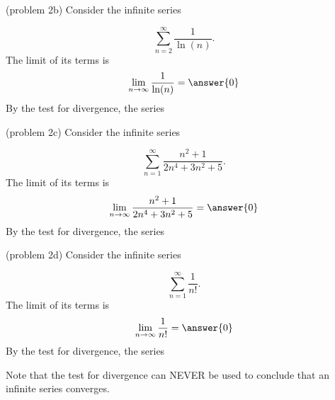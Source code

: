 \documentclass{ximera}
\begin{document}
\begin{problem}(problem 2b)
Consider the infinite series

\[
\sum_{n=2}^\infty  \frac{1}{\ln(n)}.
\]
The limit of its terms is
\[
\lim_{n\to \infty} \frac{1}{\ln(n)} = \answer{0}
\]
By the test for divergence, the series
\begin{multipleChoice}
\end{multipleChoice}

\end{problem}




\begin{problem}(problem 2c)
Consider the infinite series

\[
\sum_{n=1}^\infty \frac{n^2 + 1}{2n^4 + 3n^2 + 5}.
\]
The limit of its terms is
\[
\lim_{n\to \infty} \frac{n^2 + 1}{2n^4 + 3n^2 + 5} = \answer{0}
\]
By the test for divergence, the series
\begin{multipleChoice}
\end{multipleChoice}

\end{problem}



\begin{problem}(problem 2d)
Consider the infinite series

\[
\sum_{n=1}^\infty \frac{1}{n!}.
\]
The limit of its terms is
\[
\lim_{n\to \infty} \frac{1}{n!} = \answer{0}
\]
By the test for divergence, the series
\begin{multipleChoice}
\end{multipleChoice}

\end{problem}


\begin{remark}
Note that the test for divergence can NEVER be used to conclude that an infinite series converges.
\end{remark}
\end{document}
